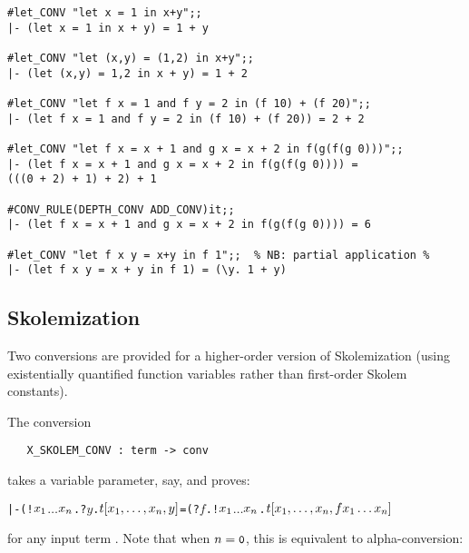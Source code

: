 \setcounter{sessioncount}{1}
\begin{session}\begin{verbatim}
#let_CONV "let x = 1 in x+y";;
|- (let x = 1 in x + y) = 1 + y

#let_CONV "let (x,y) = (1,2) in x+y";;
|- (let (x,y) = 1,2 in x + y) = 1 + 2

#let_CONV "let f x = 1 and f y = 2 in (f 10) + (f 20)";;
|- (let f x = 1 and f y = 2 in (f 10) + (f 20)) = 2 + 2

#let_CONV "let f x = x + 1 and g x = x + 2 in f(g(f(g 0)))";;
|- (let f x = x + 1 and g x = x + 2 in f(g(f(g 0)))) =
(((0 + 2) + 1) + 2) + 1

#CONV_RULE(DEPTH_CONV ADD_CONV)it;;
|- (let f x = x + 1 and g x = x + 2 in f(g(f(g 0)))) = 6

#let_CONV "let f x y = x+y in f 1";;  % NB: partial application %
|- (let f x y = x + y in f 1) = (\y. 1 + y)
\end{verbatim}\end{session}

\subsection{Skolemization}

Two conversions are provided for a higher-order version of
Skolemization (using existentially quantified function variables
rather than first-order Skolem constants).

The conversion

\begin{boxed}
\begin{verbatim}
   X_SKOLEM_CONV : term -> conv
\end{verbatim}\end{boxed}

\noindent takes a variable parameter,  say, and
proves:

\begin{hol}\begin{alltt}
   |- (!\(x\sb{1}\) \(\ldots\) \(x\sb{n}\). ?\(y\). \(t[x\sb{1},\ldots,x\sb{n},y]\)  =  (?\(f\). !\(x\sb{1}\) \(\ldots\) \(x\sb{n}\). \(t[x\sb{1},\ldots,x\sb{n},f x\sb{1}\ldots x\sb{n}]\)
\end{alltt}\end{hol}

\noindent for any input term
.
Note that when $n=\ml{0}$, this
is equivalent to alpha-conversion:


